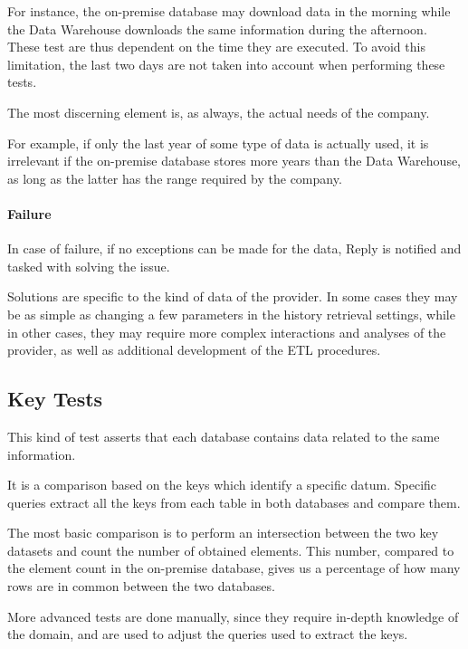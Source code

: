             For instance, the on-premise database may download data in the morning while the Data Warehouse downloads the same information during the afternoon.
            These test are thus dependent on the time they are executed.
            To avoid this limitation, the last two days are not taken into account when performing these tests.
            
            The most discerning element is, as always, the actual needs of the company.
            
            For example, if only the last year of some type of data is actually used, it is irrelevant if the on-premise database stores more years than the Data Warehouse, as long as the latter has the range required by the company.
    
    \paragraph{Failure}
        In case of failure, if no exceptions can be made for the data, Reply is notified and tasked with solving the issue.
        
        Solutions are specific to the kind of data of the provider.
        In some cases they may be as simple as changing a few parameters in the history retrieval settings, while in other cases, they may require more complex interactions and analyses of the provider, as well as additional development of the ETL procedures.
    
\subsection{Key Tests}
    This kind of test asserts that each database contains data related to the same information.
    
    It is a comparison based on the keys which identify a specific datum.
    Specific queries extract all the keys from each table in both databases and compare them.
    
    The most basic comparison is to perform an intersection between the two key datasets and count the number of obtained elements.
    This number, compared to the element count in the on-premise database, gives us a percentage of how many rows are in common between the two databases.
    
    More advanced tests are done manually, since they require in-depth knowledge of the domain, and are used to adjust the queries used to extract the keys.
    
